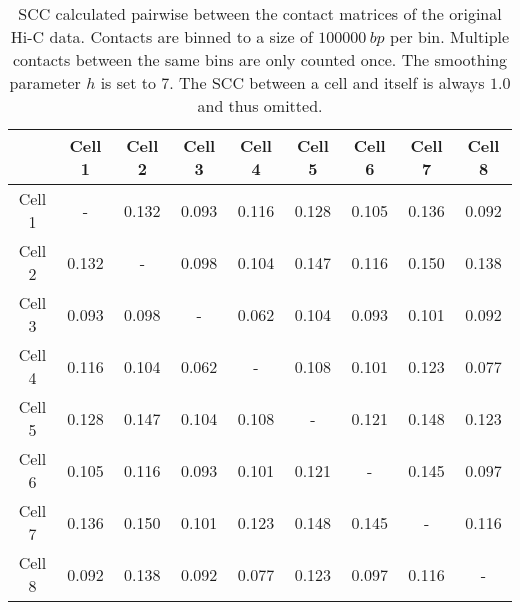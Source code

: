 \begin{table}[ht]
\centering
  \caption{SCC calculated pairwise between the contact matrices of the original Hi-C data. Contacts are binned to a size of \(\SI{100000}{bp}\) per bin. Multiple contacts between the same bins are only counted once. The smoothing parameter \(h\) is set to \(7\). The SCC between a cell and itself is always \(1.0\) and thus omitted.}
  \label{tab:scc_hic}
  \begin{tabular}{S | S S S S S S S S}
   & {Cell 1} & {Cell 2} & {Cell 3} & {Cell 4} & {Cell 5} & {Cell 6} & {Cell 7} & {Cell 8} \\
  \midrule
    {Cell 1} &  {-}  & 0.132 & 0.093 & 0.116 & 0.128 & 0.105 & 0.136 & 0.092 \\
    {Cell 2} & 0.132 &  {-}  & 0.098 & 0.104 & 0.147 & 0.116 & 0.150 & 0.138 \\
    {Cell 3} & 0.093 & 0.098 &  {-}  & 0.062 & 0.104 & 0.093 & 0.101 & 0.092 \\
    {Cell 4} & 0.116 & 0.104 & 0.062 &  {-}  & 0.108 & 0.101 & 0.123 & 0.077 \\
    {Cell 5} & 0.128 & 0.147 & 0.104 & 0.108 &  {-}  & 0.121 & 0.148 & 0.123 \\
    {Cell 6} & 0.105 & 0.116 & 0.093 & 0.101 & 0.121 &  {-}  & 0.145 & 0.097 \\
    {Cell 7} & 0.136 & 0.150 & 0.101 & 0.123 & 0.148 & 0.145 &  {-}  & 0.116 \\
    {Cell 8} & 0.092 & 0.138 & 0.092 & 0.077 & 0.123 & 0.097 & 0.116 &  {-}  \\
  \end{tabular}
\end{table}

